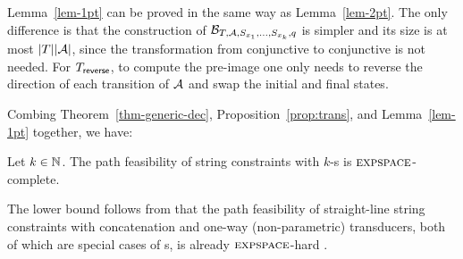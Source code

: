 
Lemma~\ref{lem-1pt} can be proved in the same way as Lemma~\ref{lem-2pt}. The only difference is that the construction of $\mathcal{B}_{T, \mathcal{A}, S_{x_1}, \ldots, S_{x_k}, q}$ is simpler and its size is at most $|T| |\mathcal{A}|$, since the transformation from  conjunctive \FFA{} to conjunctive \FA{} is not needed. For $T_{\sf reverse}$, to compute the pre-image one only needs to reverse the direction of each transition of $\mathcal{A}$ and swap the initial and final states.   

Combing Theorem~\ref{thm-generic-dec}, Proposition~\ref{prop:trans}, and Lemma~\ref{lem-1pt} together, we have:

\begin{theorem} \label{thm-rb-2pt}
Let  $k \in \mathbb{N}$. The path feasibility of string constraints with $k$-\RBPPT{}s is $\textsc{expspace}$-complete. 
\end{theorem}

The lower bound %
follows from that the path feasibility of straight-line string constraints with concatenation and one-way (non-parametric) transducers,  both of which are special cases of \PT{}s, is already $\textsc{expspace}$-hard \cite{LB16}.


